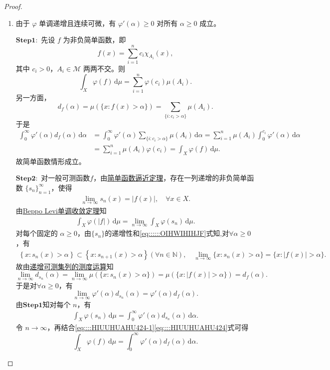 \documentclass[../../main.tex]{subfiles}%
\begin{document}
\begin{proof}
\begin{enumerate}[(1)]
\item 由于 $\varphi$ 单调递增且连续可微，有 $\varphi'(\alpha)\geqslant 0$ 对所有 $\alpha\geqslant 0$ 成立。

$\mathbf{Step}\mathbf{1}:$ 先设 $f$ 为非负简单函数，即
\[
f(x)=\sum_{i=1}^{n} c_i \chi_{A_i}(x),
\]
其中 $c_i>0$，$A_i\in\mathscr{M}$ 两两不交。则
\[
\int_X \varphi(f)\,\mathrm{d}\mu=\sum_{i=1}^{n} \varphi(c_i)\mu(A_i).
\]
另一方面，
\[
d_f(\alpha)=\mu(\{x:f(x)>\alpha\})=\sum_{\{i:c_i>\alpha\}}\mu(A_i).
\]
于是
\begin{align*}
\int_0^\infty \varphi'(\alpha)d_f(\alpha)\,\mathrm{d}\alpha
&=\int_0^\infty \varphi'(\alpha)\sum_{\{i:c_i>\alpha\}}\mu(A_i)\,\mathrm{d}\alpha =\sum_{i=1}^{n}\mu(A_i)\int_0^{c_i}\varphi'(\alpha)\,\mathrm{d}\alpha \\
&=\sum_{i=1}^{n}\mu(A_i)\varphi(c_i) =\int_X \varphi(f)\,\mathrm{d}\mu.
\end{align*}
故简单函数情形成立。

$\mathbf{Step}\mathbf{2}:$ 对一般可测函数$f$，由\hyperref[theorem:实分析-简单函数逼近定理]{简单函数逼近定理}，存在一列递增的非负简单函数 $\{s_n\}_{n=1}^{\infty}$，使得
\begin{align}
\lim\limits_{n\to\infty} s_n(x)=\left|f(x)\right|,\quad \forall x\in X.\label{eq::::::OIHWIHIHJF}
\end{align}
由\hyperref[Real Analysis-theorem:实分析-Beppo Levi单调收敛定理]{Beppo Levi单调收敛定理}知
\begin{align}
\int_X \varphi(\left|f\right|)\,\mathrm{d}\mu
=
\lim_{n\to\infty}\int_X \varphi(s_n)\,\mathrm{d}\mu. \label{eq::::HIUUHUAHU424-1}
\end{align}
对每个固定的 $\alpha\geqslant 0$，由$\{s_n\}$的递增性和\eqref{eq::::::OIHWIHIHJF}式知,对$\forall \alpha\geqslant 0$，有
\begin{align*}
\left\{ x:s_n\left( x \right) >\alpha \right\} \subset \left\{ x:s_{n+1}\left( x \right) >\alpha \right\} \left( \forall n\in \mathbb{N} \right),\quad \underset{n\rightarrow \infty}{\lim}\{x:s _n(x)>\alpha\}=\{x:\left|f(x)\right|>\alpha\}.
\end{align*}
故由\hyperref[Real Analysis-theorem:递增可测集列的测度运算]{递增可测集列的测度运算}知
\[
\lim_{n\to\infty}d_{s_n}(\alpha)=\lim_{n\to\infty}\mu(\{x:s_n(x)>\alpha\})= \mu(\{x:\left|f(x)\right|>\alpha\})=d_f(\alpha).
\]
于是对$\forall \alpha\geqslant 0$，有
\[
\lim_{n\to\infty}\varphi'(\alpha)d_{s_n}(\alpha)=\varphi'(\alpha)d_f(\alpha).
\]
由$\mathbf{Step}\mathbf{1}$知对每个 $n$，有
\begin{align}
\int_X \varphi(s_n)\,\mathrm{d}\mu
=
\int_0^\infty \varphi'(\alpha)d_{s_n}(\alpha)\,\mathrm{d}\alpha.\label{eq::::HIUUHUAHU424}
\end{align}
令 $n\to\infty$，再结合\eqref{eq::::HIUUHUAHU424-1}\eqref{eq::::HIUUHUAHU424}式可得
\[
\int_X \varphi(f)\,\mathrm{d}\mu
=
\int_0^\infty \varphi'(\alpha)d_f(\alpha)\,\mathrm{d}\alpha.
\]


\end{enumerate}
\end{proof}
\end{document}
